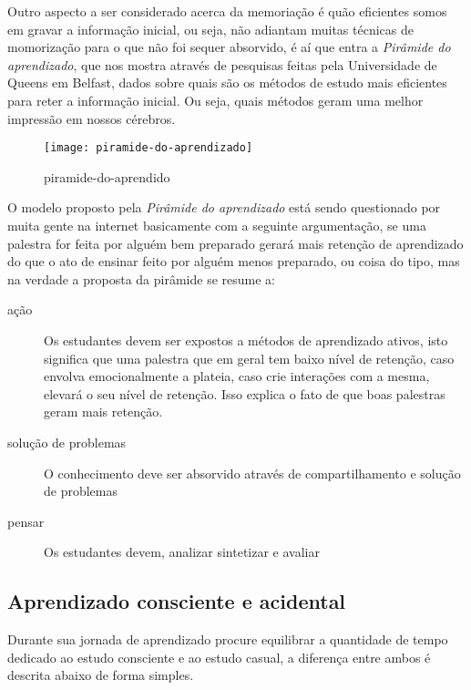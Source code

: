 Outro aspecto a ser considerado acerca da memoriação é quão eficientes
somos em gravar a informação inicial, ou seja, não adiantam muitas
técnicas de momorização para o que não foi sequer absorvido, é aí que
entra a \emph{Pirâmide do aprendizado}, que nos mostra através de pesquisas
feitas pela Universidade de Queens em Belfast, dados sobre quais são
os métodos de estudo mais eficientes para reter a informação inicial.
Ou seja, quais métodos geram uma melhor impressão em nossos cérebros.

\begin{figure}[ht!]
	\centering
	\texttt{[image: piramide-do-aprendizado]}
	\caption{piramide-do-aprendido}
\end{figure}

\newpage
O modelo proposto pela \emph{Pirâmide do aprendizado} está sendo
questionado por muita gente na internet basicamente com a seguinte
argumentação, se uma palestra for feita por alguém bem preparado
gerará mais retenção de aprendizado do que o ato de ensinar feito
por alguém menos preparado, ou coisa do tipo, mas na verdade a
proposta da pirâmide se resume a:

\begin{description}
	\item [ação] Os estudantes devem ser expostos a métodos de aprendizado ativos, isto significa que uma
		palestra que em geral tem baixo nível de retenção, caso envolva
		emocionalmente a plateia, caso crie interações com a mesma, elevará o
		seu nível de retenção. Isso explica o fato de que boas
		palestras geram mais retenção.
	\item [solução de problemas] O conhecimento deve ser absorvido através de compartilhamento e solução de problemas
	\item [pensar] Os estudantes devem, analizar sintetizar e avaliar
\end{description}


\subsection{Aprendizado consciente e acidental}
\label{sub:aprendizado_consciente_e_acidental}

Durante sua jornada de aprendizado procure equilibrar a quantidade
de tempo dedicado ao estudo consciente e ao estudo casual, a diferença
entre ambos é descrita abaixo de forma simples.

